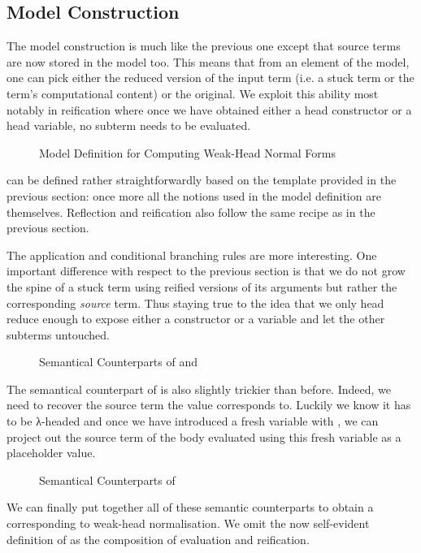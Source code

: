 \subsection{Model Construction}

The model construction is much like the previous one except
that source terms are now stored in the model too. This means that
from an element of the model, one can pick either the reduced version
of the input term (i.e. a stuck term or the term's computational
content) or the original. We exploit this ability most
notably in reification where once we have obtained either a
head constructor or a head variable, no subterm needs to
be evaluated.

\begin{figure}[h]
\caption{Model Definition for Computing Weak-Head Normal Forms\label{fig:betaiotamodel}}
\end{figure}

 can be defined rather straightforwardly based on the template provided
in the previous section: once more all the notions used in the model definition
are  themselves. Reflection and reification also follow the same recipe
as in the previous section.


The application and conditional branching rules are more
interesting. One important difference with respect to the previous
section is that we do not grow the spine of a stuck term using
reified versions of its arguments but rather the corresponding
\emph{source} term. Thus staying true to the idea that we only head
reduce enough to expose either a constructor or a variable and let
the other subterms untouched.

\begin{figure}[h]
\caption{Semantical Counterparts of  and \label{fig:betaiotaappifte}}
\end{figure}

The semantical counterpart of  is also slightly trickier than before. Indeed, we
need to recover the source term the value corresponds to. Luckily we know it has to be
λ-headed and once we have introduced a fresh variable with , we can project
out the source term of the body evaluated using this fresh variable as a placeholder
value.

\begin{figure}[h]
\caption{Semantical Counterparts of \label{fig:betaiotalam}}
\end{figure}

We can finally put together all of these semantic counterparts to
obtain a  corresponding to weak-head normalisation.
We omit the now self-evident definition of  as the
composition of evaluation and reification.
